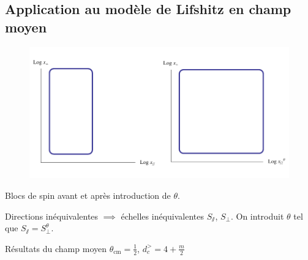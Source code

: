 \documentclass[xcolor=dvipsnames]{beamer}
\begin{document}
\subsection{Application au modèle de Lifshitz en champ moyen}
\begin{frame}

\begin{figure}[htp]
\centering
\includegraphics[scale=0.4]{img/blockspin_theta.pdf}
\label{}
\end{figure}
\begin{center}
Blocs de spin avant et après introduction de $\theta$.
\end{center}

\begin{block}{}
Directions inéquivalentes $\implies$ échelles inéquivalentes $S_\sslash$, $S_\perp$. \newline On introduit $\theta$ tel que $S_\sslash = S_\perp^\theta$. 
\end{block} 

\begin{block}{Résultats du champ moyen}
\centering
$\theta_\text{cm} = \frac{1}{2}$, $d_c^> = 4 + \frac{m}{2}$
\end{block}
\end{frame}
\end{document}

